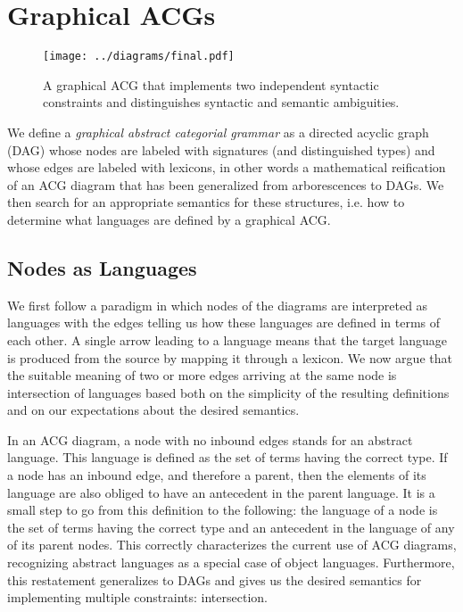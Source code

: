 \documentclass{llncs}
\begin{document}
\section{Graphical ACGs}

\begin{figure}
  \centering
  \texttt{[image: ../diagrams/final.pdf]}
  \caption{\label{fig:gacg} A graphical ACG that implements two
      independent syntactic constraints and distinguishes syntactic and
      semantic ambiguities.}
\end{figure}

We define a \emph{graphical abstract categorial grammar} as a directed acyclic
graph (DAG) whose nodes are labeled with signatures (and distinguished types)
and whose edges are labeled with lexicons, in other words a mathematical
reification of an ACG diagram that has been generalized from
arborescences to DAGs. We then search for an appropriate semantics for these
structures, i.e. how to determine what languages are defined by a graphical
ACG.

\subsection{Nodes as Languages}

We first follow a paradigm in which nodes of the diagrams are interpreted as
languages with the edges telling us how these languages are defined in terms
of each other. A single arrow leading to a language means that the target
language is produced from the source by mapping it through a lexicon. We now
argue that the suitable meaning of two or more edges arriving at the same node
is intersection of languages based both on the simplicity of the resulting
definitions and on our expectations about the desired semantics.

In an ACG diagram, a node with no inbound edges stands for an abstract
language. This language is defined as the set of terms having the correct
type. If a node has an inbound edge, and therefore a parent, then the elements
of its language are also obliged to have an antecedent in the parent
language. It is a small step to go from this definition to the following: the
language of a node is the set of terms having the correct type and an
antecedent in the language of any of its parent nodes. This correctly
characterizes the current use of ACG diagrams, recognizing abstract languages
as a special case of object languages. Furthermore, this restatement
generalizes to DAGs and gives us the desired semantics for implementing
multiple constraints: intersection.
\end{document}
